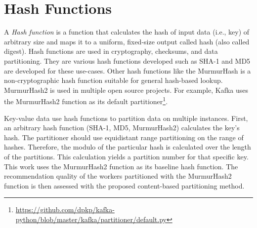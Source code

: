 \section{Hash Functions}
\label{sec:hash-functions}
A \emph{Hash function} is a function that calculates the hash of input data (i.e., key) of arbitrary size and maps it to a uniform, fixed-size output called hash (also called digest). Hash functions are used in cryptography, checksums, and data partitioning. They are various hash functions developed such as SHA-1 \cite{RFC3174USSecure} and MD5 \cite{rivestRFC1321MD5MessageDigest1992} are developed for these use-cases. Other hash functions like the MurmurHash is a non-cryptographic hash function suitable for general hash-based lookup. MurmurHash2 is used in multiple open source projects. For example, Kafka uses the MurmurHash2 function as its default partitioner\footnote{\url{https://github.com/dpkp/kafka-python/blob/master/kafka/partitioner/default.py}}.


Key-value data use hash functions to partition data on multiple instances. First, an arbitrary hash function (SHA-1, MD5, MurmurHash2) calculates the key's hash. The partitioner should use equidistant range partitioning on the range of hashes. Therefore, the modulo of the particular hash is calculated over the length of the partitions. This calculation yields a partition number for that specific key. This work uses the MurmurHash2 function as its baseline hash function. The recommendation quality of the workers partitioned with the MurmurHash2 function is then assessed with the proposed content-based partitioning method.